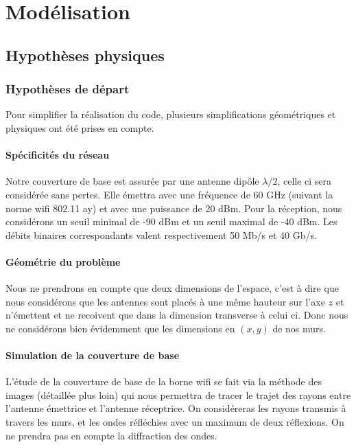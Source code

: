\chapter{Modélisation}
\label{chaper-1}
\section{Hypoth{\`e}ses physiques}

\subsection{Hypoth{\`e}ses de d{\'e}part}

Pour simplifier la r{\'e}alisation du code, plusieurs simplifications
g{\'e}om{\'e}triques et physiques ont {\'e}t{\'e} prises en compte.

\subsubsection{Sp{\'e}cificit{\'e}s du r{\'e}seau}

Notre couverture de base est assur{\'e}e par une antenne dip{\^o}le $\lambda /
2$, celle ci sera consid{\'e}r{\'e}e sans pertes. Elle {\'e}mettra avec une
fr{\'e}quence de 60 GHz (suivant la norme wifi 802.11 ay) et avec une
puissance de 20 dBm. Pour la r{\'e}ception, nous consid{\'e}rons un seuil
minimal de -90 dBm et un seuil maximal de -40 dBm. Les d{\'e}bits binaires
correspondants valent respectivement 50 Mb/s et 40 Gb/s.

\subsubsection{G{\'e}om{\'e}trie du probl{\`e}me}

Nous ne prendrons en compte que deux dimensions de l'espace, c'est {\`a} dire
que nous consid{\'e}rons que les antennes sont plac{\'e}s {\`a} une m{\^e}me
hauteur sur l'axe $z$ et n'{\'e}mettent et ne recoivent que dans la dimension
transverse {\`a} celui ci. Donc nous ne consid{\'e}rons bien {\'e}videmment
que les dimensions en $(x, y)$ de nos murs.

\subsubsection{Simulation de la couverture de base}

L'{\'e}tude de la couverture de base de la borne wifi se fait via la
m{\'e}thode des images (d{\'e}taill{\'e}e plus loin) qui nous permettra de
tracer le trajet des rayons entre l'antenne {\'e}mettrice et l'antenne
r{\'e}ceptrice. On consid{\'e}reras les rayons transmis {\`a} travers les
murs, et les ondes r{\'e}fl{\'e}chies avec un maximum de deux r{\'e}flexions.
On ne prendra pas en compte la diffraction des ondes.


